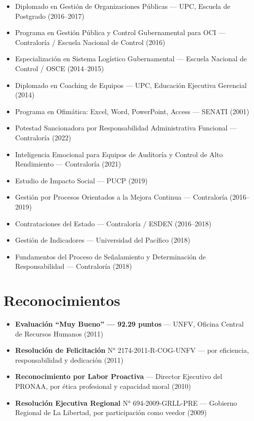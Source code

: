 \documentclass[10pt,letterpaper]{article}
\begin{document}
\begin{itemize}
  \item Diplomado en Gestión de Organizaciones Públicas — UPC, Escuela de Postgrado (2016--2017)
  \item Programa en Gestión Pública y Control Gubernamental para OCI — Contraloría / Escuela Nacional de Control (2016)
  \item Especialización en Sistema Logístico Gubernamental — Escuela Nacional de Control / OSCE (2014--2015)
  \item Diplomado en Coaching de Equipos — UPC, Educación Ejecutiva Gerencial (2014)
  \item Programa en Ofimática: Excel, Word, PowerPoint, Access — SENATI (2001)
  \item Potestad Sancionadora por Responsabilidad Administrativa Funcional — Contraloría (2022)
  \item Inteligencia Emocional para Equipos de Auditoría y Control de Alto Rendimiento — Contraloría (2021)
  \item Estudio de Impacto Social — PUCP (2019)
  \item Gestión por Procesos Orientados a la Mejora Continua — Contraloría (2016--2019)
  \item Contrataciones del Estado — Contraloría / ESDEN (2016--2018)
  \item Gestión de Indicadores — Universidad del Pacífico (2018)
  \item Fundamentos del Proceso de Señalamiento y Determinación de Responsabilidad — Contraloría (2018)
\end{itemize}
\vspace{0.1em}

\section{Reconocimientos}

\begin{itemize}
  \item \textbf{Evaluación ``Muy Bueno'' — 92.29 puntos} — UNFV, Oficina Central de Recursos Humanos (2011)
  \item \textbf{Resolución de Felicitación} N° 2174-2011-R-COG-UNFV — por eficiencia, responsabilidad y dedicación (2011)
  \item \textbf{Reconocimiento por Labor Proactiva} — Director Ejecutivo del PRONAA, por ética profesional y capacidad moral (2010)
  \item \textbf{Resolución Ejecutiva Regional} N° 694-2009-GRLL-PRE — Gobierno Regional de La Libertad, por participación como veedor (2009)
\end{itemize}
\vspace{0.1em}
\end{document}
